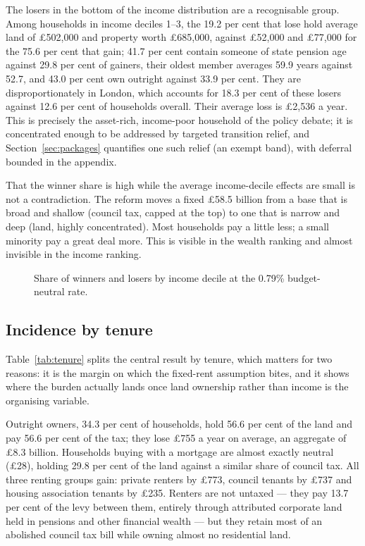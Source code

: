The losers in the bottom of the income distribution are a recognisable group. Among households in income deciles 1--3, the 19.2 per cent that lose hold average land of \pounds 502{,}000 and property worth \pounds 685{,}000, against \pounds 52{,}000 and \pounds 77{,}000 for the 75.6 per cent that gain; 41.7 per cent contain someone of state pension age against 29.8 per cent of gainers, their oldest member averages 59.9 years against 52.7, and 43.0 per cent own outright against 33.9 per cent. They are disproportionately in London, which accounts for 18.3 per cent of these losers against 12.6 per cent of households overall. Their average loss is \pounds 2{,}536 a year. This is precisely the asset-rich, income-poor household of the policy debate; it is concentrated enough to be addressed by targeted transition relief, and Section~\ref{sec:packages} quantifies one such relief (an exempt band), with deferral bounded in the appendix.

That the winner share is high while the average income-decile effects are small is not a contradiction. The reform moves a fixed \pounds 58.5 billion from a base that is broad and shallow (council tax, capped at the top) to one that is narrow and deep (land, highly concentrated). Most households pay a little less; a small minority pay a great deal more. This is visible in the wealth ranking and almost invisible in the income ranking.

\begin{figure}[htbp]
\centering
{}
\caption{Share of winners and losers by income decile at the 0.79\% budget-neutral rate.}
\label{fig:winners}
\end{figure}

\subsection{Incidence by tenure}
\label{sec:tenure}

Table~\ref{tab:tenure} splits the central result by tenure, which matters for two reasons: it is the margin on which the fixed-rent assumption bites, and it shows where the burden actually lands once land ownership rather than income is the organising variable.

Outright owners, 34.3 per cent of households, hold 56.6 per cent of the land and pay 56.6 per cent of the tax; they lose \pounds 755 a year on average, an aggregate of \pounds 8.3 billion. Households buying with a mortgage are almost exactly neutral (\pounds 28), holding 29.8 per cent of the land against a similar share of council tax. All three renting groups gain: private renters by \pounds 773, council tenants by \pounds 737 and housing association tenants by \pounds 235. Renters are not untaxed --- they pay 13.7 per cent of the levy between them, entirely through attributed corporate land held in pensions and other financial wealth --- but they retain most of an abolished council tax bill while owning almost no residential land.

